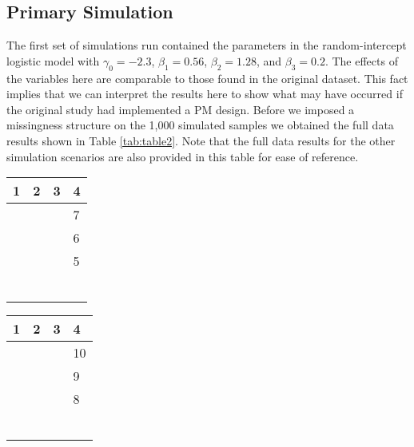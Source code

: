 \documentclass{svjour3}                     %
\begin{document}
\subsection{Primary Simulation}
\label{sec:3.1}
The first set of simulations run contained the parameters in the random-intercept logistic model with $\gamma_0 = -2.3$, $\beta_1 = 0.56$, $\beta_2 = 1.28$, and $\beta_3 = 0.2$. The effects of the variables here are comparable to those found in the original dataset. This fact implies that we can interpret the results here to show what may have occurred if the original study had implemented a PM design. Before we imposed a missingness structure on the 1,000 simulated samples we obtained the full data results shown in Table \ref{tab:table2}. Note that the full data results for the other simulation scenarios are also provided in this table for ease of reference.

\begin{Schunk}
\begin{Soutput}
% latex table generated in R 3.4.1 by xtable 1.8-2 package
% Wed May 16 17:31:14 2018
\begin{table}[ht]
\centering
\begin{tabular}{llll}
  \hline
1 & 2 & 3 & 4 \\ 
  \hline
 &  &  & 7 \\ 
   &  &  & 6 \\ 
   &  &  & 5 \\ 
   &  &  &  \\ 
   &  &  &  \\ 
   &  &  &  \\ 
   &  &  &  \\ 
   &  &  &  \\ 
   &  &  &  \\ 
   \hline
\end{tabular}
\end{table}
\end{Soutput}
\begin{Soutput}
% latex table generated in R 3.4.1 by xtable 1.8-2 package
% Wed May 16 17:31:14 2018
\begin{table}[ht]
\centering
\begin{tabular}{llll}
  \hline
1 & 2 & 3 & 4 \\ 
  \hline
 &  &  & 10 \\ 
   &  &  & 9 \\ 
   &  &  & 8 \\ 
   &  &  &  \\ 
   &  &  &  \\ 
   &  &  &  \\ 
   &  &  &  \\ 
   &  &  &  \\ 
   &  &  &  \\ 
   \hline
\end{tabular}
\end{table}
\end{Soutput}
\end{Schunk}
\end{document}
